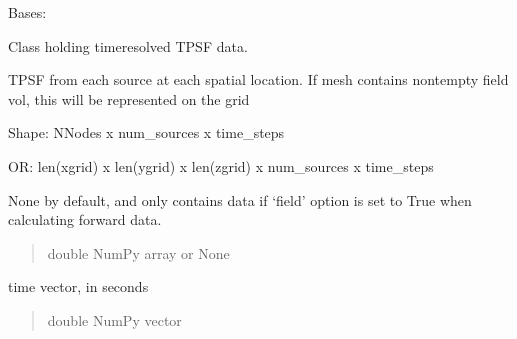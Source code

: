 \documentclass[letterpaper,10pt,english]{sphinxmanual}
\begin{document}
\begin{fulllineitems}
\label{\detokenize{_autosummary/nirfasterff.base.data.TPSFdata:nirfasterff.base.data.TPSFdata}}
\pysigstartsignatures
\pysigline
{}
\pysigstopsignatures
\sphinxAtStartPar
Bases: 

\sphinxAtStartPar
Class holding time\sphinxhyphen{}resolved TPSF data.

\begin{fulllineitems}
\label{\detokenize{_autosummary/nirfasterff.base.data.TPSFdata:nirfasterff.base.data.TPSFdata.phi}}
\pysigstartsignatures
\pysigline
{}
\pysigstopsignatures
\sphinxAtStartPar
TPSF from each source at each spatial location. If mesh contains non\sphinxhyphen{}tempty field vol, this will be represented on the grid

\sphinxAtStartPar
Shape: NNodes x num\_sources x time\_steps

\sphinxAtStartPar
OR: len(xgrid) x len(ygrid) x len(zgrid) x num\_sources x time\_steps

\sphinxAtStartPar
None by default, and only contains data if ‘field’ option is set to True when calculating forward data.
\begin{quote}\begin{description}
\sphinxAtStartPar
double NumPy array or None

\end{description}\end{quote}

\end{fulllineitems}


\begin{fulllineitems}
\label{\detokenize{_autosummary/nirfasterff.base.data.TPSFdata:nirfasterff.base.data.TPSFdata.time}}
\pysigstartsignatures
\pysigline
{}
\pysigstopsignatures
\sphinxAtStartPar
time vector, in seconds
\begin{quote}\begin{description}
\sphinxAtStartPar
double NumPy vector


\end{description}
\end{quote}
\end{fulllineitems}
\end{fulllineitems}
\end{document}
